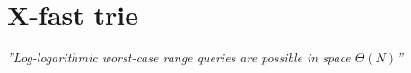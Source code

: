 \section{X-fast trie}

\emph{''Log-logarithmic worst-case range queries are possible in space \( \Theta(N) \)''} \cite{Willard1983}
